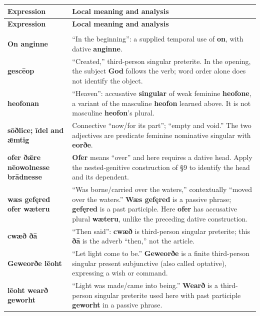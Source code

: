 \par\begingroup
\fontsize{10.5}{13.2}\selectfont
\setlength{\LTleft}{0pt}\setlength{\LTright}{\fill}
\begin{longtable}{@{}>{\raggedright\arraybackslash}p{32.28mm}>{\raggedright\arraybackslash}p{88.908mm}@{}}
\toprule
\textbf{Expression} & \textbf{Local meaning and analysis} \\
\midrule
\endfirsthead
\toprule
\textbf{Expression} & \textbf{Local meaning and analysis} \\
\midrule
\endhead
\midrule
\multicolumn{2}{r}{\footnotesize Continued on the following page.}\\
\endfoot
\bottomrule
\endlastfoot
\textbf{On anginne} & “In the beginning”: a supplied temporal use of \textbf{on}, with dative \textbf{anginne}. \\
\textbf{gescēop} & “Created,” third-person singular preterite. In the opening, the subject \textbf{God} follows the verb; word order alone does not identify the object. \\
\textbf{heofonan} & “Heaven”: accusative \textbf{singular} of weak feminine \textbf{heofone}, a variant of the masculine \textbf{heofon} learned above. It is not masculine \textbf{heofon}'s plural. \\
\textbf{sōðlice; īdel and ǣmtig} & Connective “now/\allowbreak{}for its part”; “empty and void.” The two adjectives are predicate feminine nominative singular with \textbf{eorðe}. \\
\textbf{ofer ðǣre nēowolnesse brādnesse} & \textbf{Ofer} means “over” and here requires a dative head. Apply the nested-genitive construction of §9 to identify the head and its dependent. \\
\textbf{wæs gefęred ofer wæteru} & “Was borne/\allowbreak{}carried over the waters,” contextually “moved over the waters.” \textbf{Wæs gefęred} is a passive phrase; \textbf{gefęred} is a past participle. Here \textbf{ofer} has accusative plural \textbf{wæteru}, unlike the preceding dative construction. \\
\textbf{cwæð ðā} & “Then said”: \textbf{cwæð} is third-person singular preterite; this \textbf{ðā} is the adverb “then,” not the article. \\
\textbf{Geweorðe lēoht} & “Let light come to be.” \textbf{Geweorðe} is a finite third-person singular present subjunctive (also called optative), expressing a wish or command. \\
\textbf{lēoht wearð geworht} & “Light was made/\allowbreak{}came into being.” \textbf{Wearð} is a third-person singular preterite used here with past participle \textbf{geworht} in a passive phrase. \\

\end{longtable}
